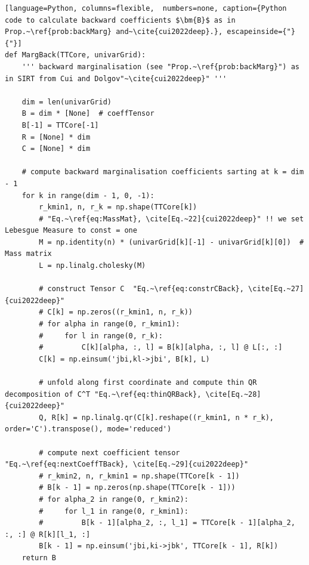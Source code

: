 \begin{lstlisting}[language=Python, columns=flexible,  numbers=none, caption={Python code to calculate backward coefficients $\bm{B}$ as in Prop.~\ref{prob:backMarg} and~\cite{cui2022deep}.}, escapeinside={"}{"}]
def MargBack(TTCore, univarGrid):
	''' backward marginalisation (see "Prop.~\ref{prob:backMarg}") as in SIRT from Cui and Dolgov"~\cite{cui2022deep}" '''
	
	dim = len(univarGrid)
	B = dim * [None]  # coeffTensor
	B[-1] = TTCore[-1]
	R = [None] * dim
	C = [None] * dim
	
	# compute backward marginalisation coefficients sarting at k = dim - 1
	for k in range(dim - 1, 0, -1):
		r_kmin1, n, r_k = np.shape(TTCore[k])
		# "Eq.~\ref{eq:MassMat}, \cite[Eq.~22]{cui2022deep}" !! we set Lebesgue Measure to const = one
		M = np.identity(n) * (univarGrid[k][-1] - univarGrid[k][0])  # Mass matrix
		L = np.linalg.cholesky(M)
		
		# construct Tensor C  "Eq.~\ref{eq:constrCBack}, \cite[Eq.~27]{cui2022deep}"
		# C[k] = np.zeros((r_kmin1, n, r_k))
		# for alpha in range(0, r_kmin1):
		#     for l in range(0, r_k):
		#         C[k][alpha, :, l] = B[k][alpha, :, l] @ L[:, :]
		C[k] = np.einsum('jbi,kl->jbi', B[k], L)

		# unfold along first coordinate and compute thin QR decomposition of C^T "Eq.~\ref{eq:thinQRBack}, \cite[Eq.~28]{cui2022deep}"
		Q, R[k] = np.linalg.qr(C[k].reshape((r_kmin1, n * r_k), order='C').transpose(), mode='reduced')
		
		# compute next coefficient tensor "Eq.~\ref{eq:nextCoeffTBack}, \cite[Eq.~29]{cui2022deep}"
		# r_kmin2, n, r_kmin1 = np.shape(TTCore[k - 1])
		# B[k - 1] = np.zeros(np.shape(TTCore[k - 1]))
		# for alpha_2 in range(0, r_kmin2):
		#     for l_1 in range(0, r_kmin1):
		#         B[k - 1][alpha_2, :, l_1] = TTCore[k - 1][alpha_2, :, :] @ R[k][l_1, :]
		B[k - 1] = np.einsum('jbi,ki->jbk', TTCore[k - 1], R[k])
	return B

\end{lstlisting}
\clearpage

